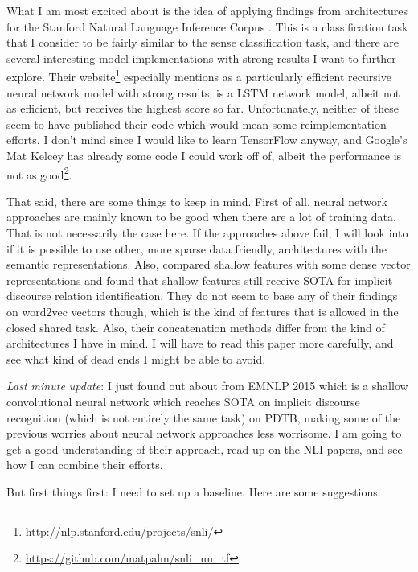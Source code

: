 What I am most excited about is the idea of applying findings from architectures for the Stanford Natural Language Inference Corpus \citep{bowman_large_2015}. This is a classification task that I consider to be fairly similar to the sense classification task, and there are several interesting model implementations with strong results I want to further explore. Their website\footnote{\url{http://nlp.stanford.edu/projects/snli/}} especially mentions \cite{mou_recognizing_2015} as a particularly efficient recursive neural network model with strong results. \cite{cheng_long_2016} is a LSTM network model, albeit not as efficient, but receives the highest score so far. Unfortunately, neither of these seem to have published their code which would mean some reimplementation efforts. I don't mind since I would like to learn TensorFlow anyway, and Google's Mat Kelcey has already some code I could work off of, albeit the performance is not as good\footnote{\url{https://github.com/matpalm/snli_nn_tf}}.

That said, there are some things to keep in mind. First of all, neural network approaches are mainly known to be good when there are a lot of training data. That is not necessarily the case here. If the approaches above fail, I will look into if it is possible to use other, more sparse data friendly, architectures with the semantic representations. Also, \cite{braud_comparing_2015} compared shallow features with some dense vector representations and found that shallow features still receive SOTA for implicit discourse relation identification. They do not seem to base any of their findings on word2vec vectors though, which is the kind of features that is allowed in the closed shared task. Also, their concatenation methods differ from the kind of architectures I have in mind. I will have to read this paper more carefully, and see what kind of dead ends I might be able to avoid.

\emph{Last minute update}: I just found out about \cite{zhang_shallow_2015} from EMNLP 2015 which is a shallow convolutional neural network which reaches SOTA on implicit discourse recognition (which is not entirely the same task) on PDTB, making some of the previous worries about neural network approaches less worrisome. I am going to get a good understanding of their approach, read up on the NLI papers, and see how I can combine their efforts.

But first things first: I need to set up a baseline. Here are some suggestions:

